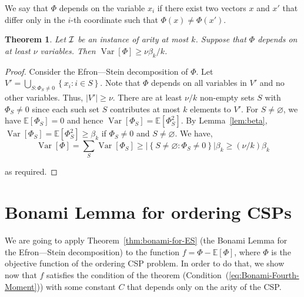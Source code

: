 \documentclass[11pt]{article}
\newif\ifconf
\DeclareMathOperator {\Var}  {Var}
\newcommand {\set}   [1] {\left\{ #1 \right\}}
\newcommand {\Exp}       {\mathbb{E}}
\newcommand {\E}     [1] {\Exp\left[#1\right]}
\newcommand {\Varr}  [1] {\Var \left[#1\right]}
\newtheorem{theorem}{Theorem}
\begin{document}
We say that $\Phi$ depends on the variable $x_i$ if there exist two vectors $x$ and $x'$ that differ only in the $i$-th
coordinate such that $\Phi(x) \neq \Phi(x')$.

\begin{theorem}\label{thm:variance}
Let $\cal I$ be an instance of arity at most $k$. Suppose that $\Phi$ depends on
at least $\nu$ variables. Then  $\Varr{\Phi} \geq \nu \beta_k/k$.
\end{theorem}
\begin{proof}
Consider the Efron---Stein decomposition of $\Phi$. Let
$V' = \bigcup_{S: \Phi_S \neq 0} \set{x_i:i\in S}$.
Note that $\Phi$ depends on all variables in $V'$ and no other variables. Thus, $|V'|\geq\nu$.
There are at least $\nu / k$ non-empty sets $S$ with $\Phi_S \neq 0$ since each such set $S$ contributes at most $k$ elements to $V'$.
For $S\neq \varnothing$, we have $\E{\Phi_S} = 0$  and hence $\Varr{\Phi_S} = \E{\Phi_S^2}$. By Lemma~\ref{lem:beta},
$\Varr{\Phi_S} = \E{\Phi_S^2} \geq \beta_k$ if $\Phi_S \neq 0$ and $S\neq \varnothing$. We have,
\begin{equation*}\Varr{\Phi} = \sum_S \Varr{\Phi_S}
\geq |\set{S\neq \varnothing:\Phi_S \neq 0}| \beta_k
\geq (\nu / k) \beta_k\ifconf.\tag*{\qedhere}\fi
\end{equation*}
\ifconf\else
as required.
\fi
\end{proof}

\section{Bonami Lemma for ordering CSPs}
We are going to apply Theorem~\ref{thm:bonami-for-ES} (the Bonami Lemma for the Efron---Stein decomposition) to the function $f = \Phi - \E{\Phi}$, where $\Phi$ is the objective function of the ordering CSP problem. In order to do that, we show now that $f$ satisfies the condition of the theorem
(Condition~(\ref{eq:Bonami-Fourth-Moment})) with some constant $C$ that depends only on the arity of the CSP.
\end{document}
